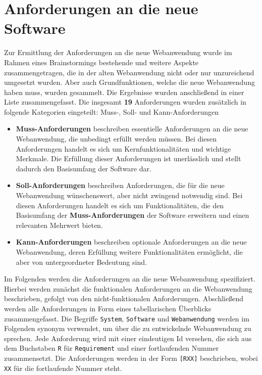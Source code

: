
\chapter{Anforderungen an die neue Software}
\label{chapter:5}

Zur Ermittlung der Anforderungen an die neue Webanwendung wurde im Rahmen eines Brainstormings bestehende und weitere Aspekte zusammengetragen, die in der alten Webanwendung nicht oder nur unzureichend umgesetzt wurden.
Aber auch Grundfunktionen, welche die neue Webanwendung haben muss, wurden gesammelt.
Die Ergebnisse wurden anschließend in einer Liste zusammengefasst.
Die insgesamt \textbf{19} Anforderungen wurden zusätzlich in folgende Kategorien eingeteilt: Muss-, Soll- und Kann-Anforderungen

\begin{itemize}
    \item \textbf{Muss-Anforderungen} beschreiben essentielle Anforderungen an die neue Webanwendung, die unbedingt erfüllt werden müssen. Bei diesen Anforderungen handelt es sich um Kernfunktionalitäten und wichtige Merkmale. Die Erfüllung dieser Anforderungen ist unerlässlich und stellt dadurch den Basisumfang der Software dar.

    \item \textbf{Soll-Anforderungen} beschreiben Anforderungen, die für die neue Webanwendung wünschenswert, aber nicht zwingend notwendig sind. Bei diesen Anforderungen handelt es sich um Funktionalitäten, die den Basisumfang der \textbf{Muss-Anforderungen} der Software erweitern und einen relevanten Mehrwert bieten.

    \item \textbf{Kann-Anforderungen} beschreiben optionale Anforderungen an die neue Webanwendung, deren Erfüllung weitere Funktionalitäten ermöglicht, die aber von untergeordneter Bedeutung sind.
\end{itemize}

Im Folgenden werden die Anforderungen an die neue Webanwendung spezifiziert. Hierbei werden zunächst die funktionalen Anforderungen an die Webanwendung beschrieben, gefolgt von den nicht-funktionalen Anforderungen. Abschließend werden alle Anforderungen in Form eines tabellarischen Überblicks zusammengefasst. Die Begriffe \texttt{System}, \texttt{Software} und \texttt{Webanwendung} werden im Folgenden synonym verwendet, um über die zu entwickelnde Webanwendung zu sprechen. Jede Anforderung wird mit einer eindeutigen Id versehen, die sich aus dem Buchstaben \texttt{R} für \texttt{Requirement} und einer fortlaufenden Nummer zusammensetzt. Die Anforderungen werden in der Form \texttt{[RXX]} beschrieben, wobei \texttt{XX} für die fortlaufende Nummer steht.

